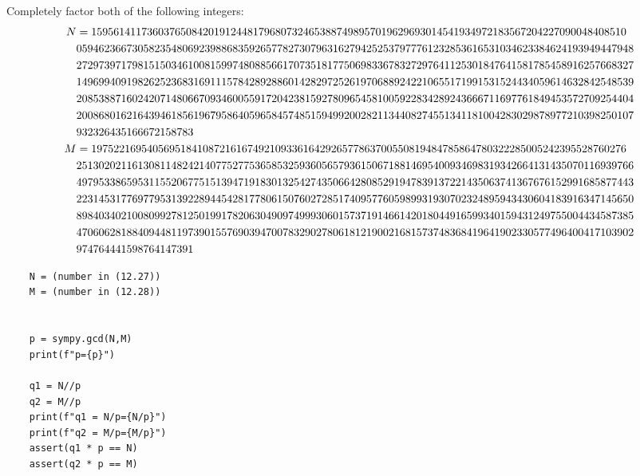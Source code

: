 Completely factor both of the following integers:
\begin{align}
    N &= 159561411736037650842019124481796807324653887498957019629693014541934972183567204227090048408510 \notag \\
    &0594623667305823548069239886835926577827307963162794252537977761232853616531034623384624193949447948 \notag \\
    &2729739717981515034610081599748088566170735181775069833678327297641125301847641581785458916257668327 \notag \\
    &1496994091982625236831691115784289288601428297252619706889242210655171991531524434059614632842548539 \notag \\
    &2085388716024207148066709346005591720423815927809654581005922834289243666711697761849453572709254404 \notag \\
    &2008680162164394618561967958640596584574851594992002821134408274551341181004283029878977210398250107 \notag \\
    &932326435166672158783 \\
    M &= 197522169540569518410872161674921093361642926577863700550819484785864780322285005242395528760276 \notag \\
    &2513020211613081148242140775277536585325936056579361506718814695400934698319342664131435070116939766 \notag \\
    &4979533865953115520677515139471918301325427435066428085291947839137221435063741367676152991685877443 \notag \\
    &2231453177697795313922894454281778061507602728517409577605989931930702324895943430604183916347145650 \notag \\
    &8984034021008099278125019917820630490974999306015737191466142018044916599340159431249755004434587385 \notag \\
    &4706062818840944811973901557690394700783290278061812190021681573748368419641902330577496400417103902 \notag \\
    &974764441598764147391
\end{align}


\begin{lstlisting}
    N = (number in (12.27))
    M = (number in (12.28))

    
    p = sympy.gcd(N,M)
    print(f"p={p}")
    
    q1 = N//p
    q2 = M//p
    print(f"q1 = N/p={N/p}")
    print(f"q2 = M/p={M/p}")
    assert(q1 * p == N)
    assert(q2 * p == M)
\end{lstlisting}


